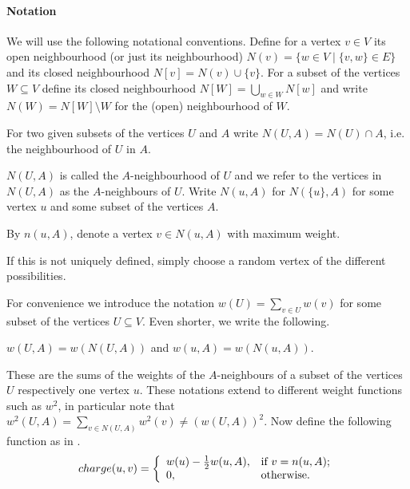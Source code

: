 \paragraph{Notation} We will use the following notational conventions. Define for a vertex $v \in V$ its open neighbourhood (or just its neighbourhood) $N(v) = \{ w \in V \mid \{v,w\} \in E \}$ and its closed neighbourhood $N[v] = N(v) \cup \{v\}$. For a subset of the vertices $W \subseteq V$ define its closed neighbourhood $N[W] = \bigcup_{w \in W} N[w]$ and write $N(W) = N[W] \setminus W$ for the (open) neighbourhood of $W$.
%
\begin{defn}
For two given subsets of the vertices $U$ and $A$ write $N(U,A) = N(U) \cap A$, i.e. the neighbourhood of $U$ in $A$.
\end{defn}
%
$N(U,A)$ is called the $A$-neighbourhood of $U$ and we refer to the vertices in $N(U,A)$ as the $A$-neighbours of $U$. Write $N(u,A)$ for $N(\{u\},A)$ for some vertex $u$ and some subset of the vertices $A$.
%
\begin{defn}
By $n(u,A)$, denote a vertex $v \in N(u,A)$ with maximum weight.
\end{defn}
%
If this is not uniquely defined, simply choose a random vertex of the different possibilities. %

For convenience we introduce the notation $w(U) = \sum_{v \in U} w(v)$ for some subset of the vertices $U \subseteq V$. Even shorter, we write the following.
%
\begin{defn}
$w(U,A) = w(N(U,A))$ and $w(u,A) = w(N(u,A))$.
\end{defn}
%
These are the sums of the weights of the $A$-neighbours of a subset of the vertices $U$ respectively one vertex $u$. These notations extend to different weight functions such as $w^2$, in particular note that $w^2(U,A) = \sum_{v \in N(U,A)} w^2(v) \neq \left( w(U,A) \right)^2$. Now define the following function as in \cite{Berman}.
%
\begin{equation*}
charge(u,v) = \left\{
                \begin{array}{ll}
                  w(u) - \frac{1}{2}w(u,A), & \hbox{if $v = n(u,A)$;} \\
                  0, & \hbox{otherwise.}
                \end{array}
              \right.
\end{equation*}


